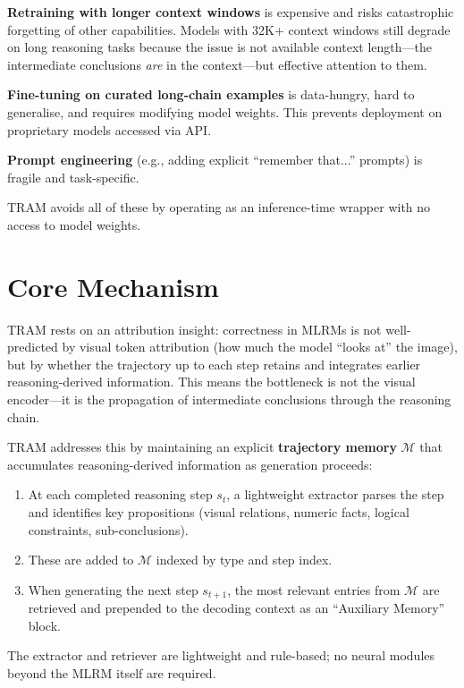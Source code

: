 \documentclass[10pt,twocolumn]{article}
\begin{document}
\textbf{Retraining with longer context windows} is expensive and risks catastrophic
forgetting of other capabilities. Models with 32K+ context windows still degrade
on long reasoning tasks because the issue is not available context length---the
intermediate conclusions \emph{are} in the context---but effective attention to them.

\textbf{Fine-tuning on curated long-chain examples} is data-hungry, hard to generalise,
and requires modifying model weights. This prevents deployment on proprietary models
accessed via API.

\textbf{Prompt engineering} (e.g., adding explicit ``remember that...'' prompts) is
fragile and task-specific.

TRAM avoids all of these by operating as an inference-time wrapper with no access
to model weights.

\section{Core Mechanism}

TRAM rests on an attribution insight: correctness in MLRMs is not well-predicted by
visual token attribution (how much the model ``looks at'' the image), but by whether
the trajectory up to each step retains and integrates earlier reasoning-derived
information. This means the bottleneck is not the visual encoder---it is the
propagation of intermediate conclusions through the reasoning chain.

TRAM addresses this by maintaining an explicit \textbf{trajectory memory} $\mathcal{M}$
that accumulates reasoning-derived information as generation proceeds:

\begin{enumerate}[itemsep=2pt,parsep=0pt]
  \item At each completed reasoning step $s_t$, a lightweight extractor parses the
    step and identifies key propositions (visual relations, numeric facts, logical
    constraints, sub-conclusions).
  \item These are added to $\mathcal{M}$ indexed by type and step index.
  \item When generating the next step $s_{t+1}$, the most relevant entries from
    $\mathcal{M}$ are retrieved and prepended to the decoding context as an
    ``Auxiliary Memory'' block.
\end{enumerate}

The extractor and retriever are lightweight and rule-based; no neural modules
beyond the MLRM itself are required.
\end{document}
